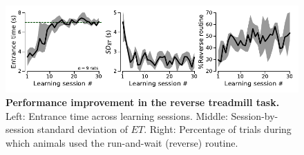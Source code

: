 \begin{figure}[h!]
	\begin{center}
	  \includegraphics[scale=1]{ch-appendicies/figures/RevTrdLearning.pdf}
	  \caption
	  {\textbf{Performance improvement in the reverse treadmill task.}
	  Left: Entrance time across learning sessions.
	  Middle: Session-by-session standard deviation of $ET$.
	  Right: Percentage of trials during which animals used the run-and-wait (reverse) routine.
	  }
	  \label{fig:appendix:revLearn}
	\end{center}
  \end{figure}